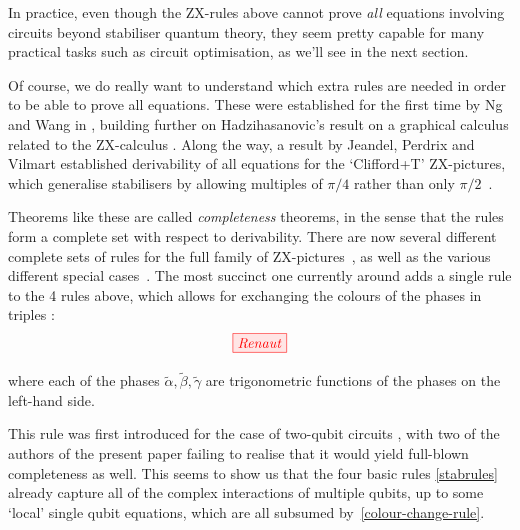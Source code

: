 \documentclass[11pt]{article}
\theoremstyle{definition}
\newcommand{\beq}{\begin{equation}}
\newcommand{\eeq}{\end{equation}\par\noindent}
\begin{document}
{%



In practice, even though the ZX-rules above cannot prove \textit{all} equations involving circuits beyond stabiliser quantum theory, they seem pretty capable for many practical tasks such as circuit optimisation, as we'll see in the next section. %

Of course, we do really want to understand which extra rules are needed in order to be able to prove all equations.  These were established for the first time by Ng and Wang in \cite{ng2017universal}, building further on Hadzihasanovic's result on a graphical calculus related to the ZX-calculus \cite{hadzihasanovic2017algebra, hadzihasanovic2018two}. Along the way, a result by Jeandel, Perdrix and Vilmart established derivability of all equations for the `Clifford+T' ZX-pictures, which generalise stabilisers by allowing multiples of $\pi/4$ rather than only $\pi/2$~\cite{jeandel2018complete}.  

Theorems like these are called \textit{completeness} theorems, in the sense that the rules form a complete set with respect to derivability. There are now several different complete sets of rules for the full family of ZX-pictures~\cite{ng2017universal,vilmart2019near}, as well as the various different special cases~\cite{jpvnormalform,jeandel2018complete,jeandel2018diagrammatic,zxtri}. The most succinct one currently around adds a single rule to the 4 rules above, which allows for exchanging the colours of the phases in triples \cite{vilmart2019near}:  
\beq\label{colour-change-rule} 
\tikzfig{Renaut} 
\eeq
where each of the phases $\tilde\alpha, \tilde\beta, \tilde\gamma$ are trigonometric functions of the phases on the left-hand side.

This rule was first introduced for the case of two-qubit circuits \cite{DBLP:conf/rc/CoeckeW18}, with two of the authors of the present paper failing to realise that it would yield full-blown completeness as well. This seems to show us that the four basic rules \eqref{stabrules} already capture all of the complex interactions of multiple qubits, up to some `local' single qubit equations, which are all subsumed by~\eqref{colour-change-rule}.

}
\end{document}
